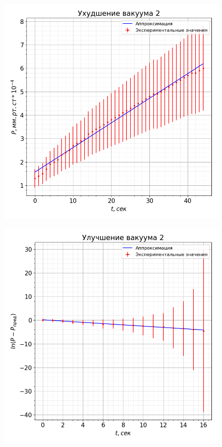 \documentclass[a4paper, 12pt]{article}
\begin{document}
            \begin{figure}[ht]
                \centering
                \begin{minipage}{0.45\textwidth}
                    \centering
                    \includegraphics[width=1\linewidth]{graphs/rise2.png}
                    \label{rise2}
                \end{minipage}
                \begin{minipage}{0.45\textwidth}
                    \centering
                    \includegraphics[width=1\linewidth]{graphs/fall2.png}
                    \label{fall2}
                \end{minipage}
            \end{figure}
\end{document}

